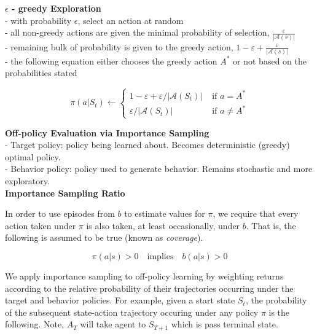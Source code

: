 \documentclass{article}
\begin{document}
\noindent
\textbf{$\epsilon$ - greedy Exploration}\\
- with probability $\epsilon$, select an action at random\\
- all non-greedy actions are given the minimal probability of selection, $\frac{\varepsilon}{|\mathcal{A}(s)|}$\\
- remaining bulk of probability is given to the greedy action,
$1-\varepsilon+\frac{\varepsilon}{|\mathcal{A}(s)|}$ \\
- the following equation either chooses the greedy action $A^{*}$ or not based on
the probabilities stated

\begin{equation}
\pi\left(a | S_{t}\right) \leftarrow\left\{\begin{array}{ll}
1-\varepsilon+\varepsilon /\left|\mathcal{A}\left(S_{t}\right)\right| & \text { if } a=A^{*} \\
\varepsilon /\left|\mathcal{A}\left(S_{t}\right)\right| & \text { if } a \neq A^{*}
\end{array}\right.
\end{equation}

\noindent
\textbf{Off-policy Evaluation via Importance Sampling}\\
- Target policy: policy being learned about. Becomes deterministic (greedy)
optimal policy.\\
- Behavior policy: policy used to generate behavior. Remains stochastic and more
exploratory.\\

\noindent
\textbf{Importance Sampling Ratio}

\noindent
In order to use episodes from $b$ to estimate values for $\pi$, we require that
every action taken under $\pi$ is also taken, at least occasionally, under $b$.
That is, the following is assumed to be true (known as \textit{coverage}).

\begin{equation}
\pi(a | s) > 0 \quad \text{implies} \quad b(a|s) > 0
\end{equation}

\noindent
We apply importance sampling to off-policy learning by weighting returns
according to the relative probability of their trajectories occurring under the
target and behavior policies. For example, given a start state $S_{t}$, the
probability of the subsequent state-action trajectory occuring under any policy
$\pi$ is the following. Note, $A_{T}$ will take agent to $S_{T+1}$ which is pass
terminal state.
\end{document}
